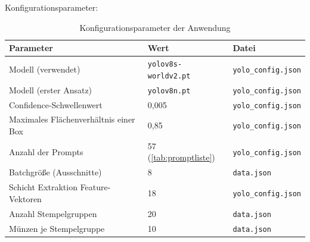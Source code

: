 \begin{landscape}
\begin{longtable}{
    |c|
    |c|
    |c|
    |p{2.5cm}|
    |p{2.2cm}|
    |p{2.5cm}|
    |p{2.5cm}|
}
\end{longtable}

\normalsize

\end{landscape}

Konfigurationsparameter:
\begin{table}[H]
    \centering
    \caption{Konfigurationsparameter der Anwendung}
    \label{tab:konfigurationsparameter}

    \begin{tabularx}{\textwidth}{|X|l|l|}
        \hline
        \textbf{Parameter} &
        \textbf{Wert} &
        \textbf{Datei} \\
        \hline

        Modell (verwendet)
            & \texttt{yolov8s-worldv2.pt}
            & \texttt{yolo\_config.json} \\
        \hline

        Modell (erster Ansatz)
            & \texttt{yolov8n.pt}
            & \texttt{yolo\_config.json} \\
        \hline

        Confidence-Schwellenwert
            & 0{,}005
            & \texttt{yolo\_config.json} \\
        \hline

        Maximales Flächenverhältnis einer Box
            & 0{,}85
            & \texttt{yolo\_config.json} \\
        \hline

        Anzahl der Prompts
            & 57 (\cref{tab:promptliste})
            & \texttt{yolo\_config.json} \\
        \hline

        Batchgröße (Ausschnitte)
            & 8
            & \texttt{data.json} \\
        \hline

        Schicht Extraktion Feature-Vektoren 
            & 18 
            & \texttt{yolo\_config.json} \\
        \hline

        Anzahl Stempelgruppen
            & 20
            & \texttt{data.json} \\
        \hline

        Münzen je Stempelgruppe
            & 10
            & \texttt{data.json} \\
        \hline


\end{tabularx}
\end{table}

